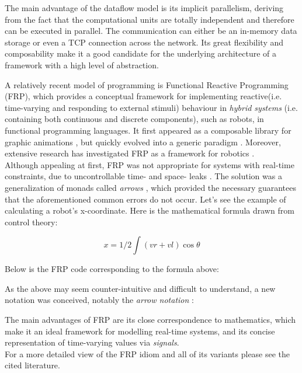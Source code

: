 \documentclass{dithesis}
\begin{document}
The main advantage of the dataflow model is its implicit parallelism, deriving from the fact that the computational units are totally independent and therefore can be executed in parallel. The communication can either be an in-memory data storage or even a TCP connection across the network. Its great flexibility and composability make it a good candidate for the underlying architecture of a framework with a high level of abstraction.

A relatively recent model of programming is Functional Reactive Programming (FRP), which provides a conceptual framework for implementing reactive(i.e. time-varying and responding to external stimuli) behaviour in \textit{hybrid systems} (i.e. containing both continuous and discrete components), such as robots, in functional programming languages. It first appeared as a composable library for graphic animations \cite{fran}, but quickly evolved into a generic paradigm \cite{survey_frp,real_frp,pushpull_frp}. Moreover, extensive research has investigated FRP as a framework for robotics \cite{arrows_robots,lambda_in_motion}. \\
Although appealing at first, FRP was not appropriate for systems  with real-time constraints, due to uncontrollable time- and space- leaks \cite{event_frp}. The solution was a generalization of monads called \textit{arrows} \cite{arrows}, which provided the necessary guarantees that the aforementioned common errors do not occur. Let's see the example of calculating a robot's x-coordinate. Here is the mathematical formula drawn from control theory:

$$ x = 1/2 \int (vr + vl) \cos\theta $$ 

Below is the FRP code corresponding to the formula above:


As the above may seem counter-intuitive and difficult to understand, a new notation was conceived, notably the \textit{arrow notation} \cite{arrows_notation}:


The main advantages of FRP are its close correspondence to mathematics, which make it an ideal framework for modelling real-time systems, and its concise representation of time-varying values via \textit{signals}. \\
For a more detailed view of the FRP idiom and all of its variants please see the cited literature.

\end{document}
